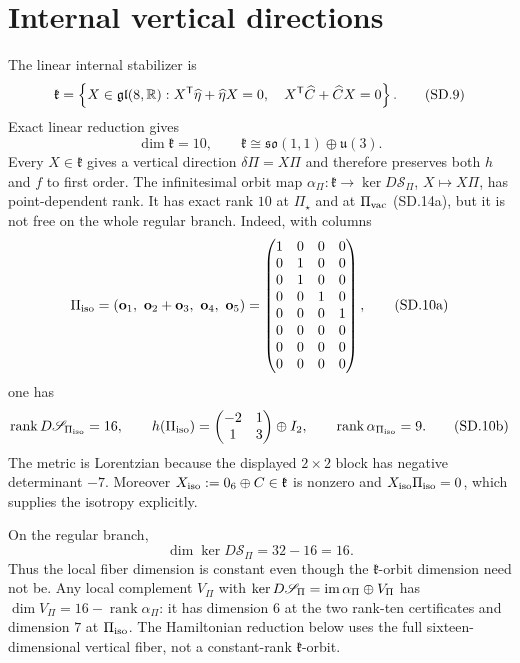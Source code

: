 \documentclass[10pt]{article}
\newcommand{\hateta}{\widehat\eta}
\newcommand{\hatC}{\widehat C}
\newcommand{\rankop}{\operatorname{rank}}
\begin{document}
\section{Internal vertical directions}

The linear internal stabilizer is
\[
\mathfrak k=
\left\{X\in\mathfrak{gl}(8,\RR):
X^{\mathsf T}\hateta+\hateta X=0,\quad
X^{\mathsf T}\hatC+\hatC X=0\right\}.
\tag{SD.9}
\]
Exact linear reduction gives
\[
\dim\mathfrak k=10,
\qquad
\mathfrak k\cong\mathfrak{so}(1,1)\oplus\mathfrak u(3).
\tag{SD.10}
\]
Every $X\in\mathfrak k$ gives a vertical direction $\delta\Pi=X\Pi$ and
therefore preserves both $h$ and $f$ to first order.  The infinitesimal orbit
map $\alpha_\Pi:\mathfrak k\to\ker D\mathscr S_\Pi$, $X\mapsto X\Pi$, has
point-dependent rank.  It has exact rank $10$ at $\Pi_\star$ and at
$\Pi_{\rm vac}$ (SD.14a), but it is not free on the whole regular branch.
Indeed, with columns
\[
\Pi_{\rm iso}=(\mathbf o_1,\ \mathbf o_2+\mathbf o_3,\ \mathbf o_4,\ \mathbf o_5)
=
\begin{pmatrix}
1&0&0&0\\
0&1&0&0\\
0&1&0&0\\
0&0&1&0\\
0&0&0&1\\
0&0&0&0\\
0&0&0&0\\
0&0&0&0
\end{pmatrix},
\tag{SD.10a}
\]
one has
\[
\rankop D\mathscr S_{\Pi_{\rm iso}}=16,
\qquad
h(\Pi_{\rm iso})=
\begin{pmatrix}-2&1\\1&3\end{pmatrix}\oplus I_2,
\qquad
\rankop\alpha_{\Pi_{\rm iso}}=9.
\tag{SD.10b}
\]
The metric is Lorentzian because the displayed $2\times2$ block has negative
determinant $-7$.  Moreover
$X_{\rm iso}:=0_6\oplus C\in\mathfrak k$ is nonzero and
$X_{\rm iso}\Pi_{\rm iso}=0$, which supplies the isotropy explicitly.

On the regular branch,
\[
\dim\ker D\mathscr S_\Pi=32-16=16.
\tag{SD.11}
\]
Thus the local fiber dimension is constant even though the
$\mathfrak k$-orbit dimension need not be.  Any local complement
$V_\Pi$ with
$\ker D\mathscr S_\Pi=\operatorname{im}\alpha_\Pi\oplus V_\Pi$ has
$\dim V_\Pi=16-\rankop\alpha_\Pi$: it has dimension $6$ at the two rank-ten
certificates and dimension $7$ at $\Pi_{\rm iso}$.  The Hamiltonian reduction
below uses the full sixteen-dimensional vertical fiber, not a constant-rank
$\mathfrak k$-orbit.
\end{document}

